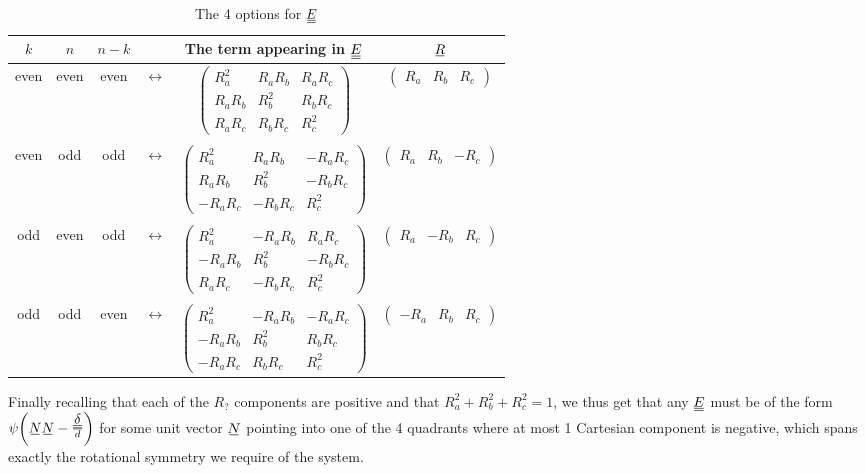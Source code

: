 \documentclass[11pt]{article}
\begin{document}
\begin{table}[H]
    \begin{center}
        \begin{tabular}{ c|c|c c c c } 
            $k$ & $n$ & $n-k$ & & The term appearing in $\du{E}$ & $\su{R}$ \\
             \hline
             even & even & even & $\leftrightarrow$ & $\begin{pmatrix}R_a^2 & R_a R_b & R_a R_c \\ R_a R_b & R_b^2 & R_b R_c \\ R_a R_c & R_b R_c & R_c^2 \end{pmatrix}$ & $\begin{pmatrix}R_a & R_b & R_c\end{pmatrix}$ \\
            &&&&\\
             even & odd & odd & $\leftrightarrow$ & $\begin{pmatrix}
                R_a^2 & R_a R_b & -R_a R_c \\
                R_a R_b & R_b^2 & -R_b R_c \\
                -R_a R_c & -R_b R_c & R_c^2
                 \end{pmatrix}$ & $\begin{pmatrix}R_a & R_b & -R_c\end{pmatrix}$ \\
            &&&&\\
             odd & even & odd & $\leftrightarrow$ & $\begin{pmatrix}
                R_a^2 & -R_a R_b & R_a R_c \\
                -R_a R_b & R_b^2 & -R_b R_c \\
                R_a R_c & -R_b R_c & R_c^2
                 \end{pmatrix}$ & $\begin{pmatrix}R_a & -R_b & R_c\end{pmatrix}$ \\
            &&&&\\
             odd & odd & even & $\leftrightarrow$ & $\begin{pmatrix}
                R_a^2 & -R_a R_b & -R_a R_c \\
                -R_a R_b & R_b^2 & R_b R_c \\
                -R_a R_c & R_b R_c & R_c^2
                 \end{pmatrix}$ & $\begin{pmatrix}-R_a & R_b & R_c\end{pmatrix}$
        \end{tabular}
    \end{center}
    \caption{The 4 options for $\du{E}$}
\end{table}
Finally recalling that each of the $R_?$ components are positive and that $R_a^2 + R_b^2 + R_c^2 = 1$, we thus get that any $\du{E}$ must be of the form $\psi\qty(\su{N}\su{N} - \frac{\du{\delta}}{d})$ for some unit vector $\su{N}$ pointing into one of the 4 quadrants where at most 1 Cartesian component is negative, which spans exactly the rotational symmetry we require of the system.
\end{document}
